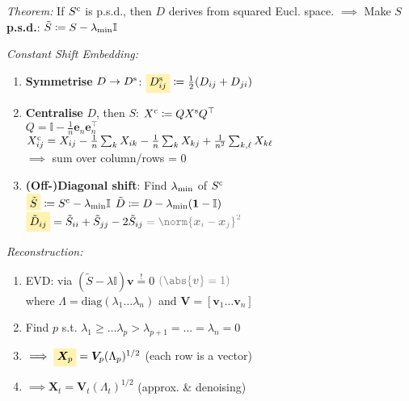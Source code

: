 \emph{Theorem:}\enspace
If $S^\mathrm{c}$ is p.s.d., then $D$ derives from squared Eucl. space.
$\implies$ Make $S$ \textbf{p.s.d.}: \enskip $\tilde S \coloneqq S - \lambda_\mathrm{min} \mathbb I$

\emph{Constant Shift Embedding:}\\
\begin{enumerate}
    \item \textbf{Symmetrise} $D \to D^\mathrm{s}$:
        \enskip $\highlight{D_{ij}\ap{s}} \coloneqq \frac12 (D_{ij} + D_{ji})$
    \item \textbf{Centralise} $D$, then $S$:
        \enskip $X^\mathrm{c} \coloneqq Q X^\mathrm{s} Q^\top$\\
        $Q = \mathbb I - \frac1n \bm e_n \bm e_n^\top$
        \qquad {}\\
        $X^\mathrm{c}_{ij} = X_{ij} - \frac1n \sum_k X_{ik} - \frac1n \sum_k X_{kj} + \frac{1}{n^2} \sum_{k,\ell} X_{k\ell}$\\
        $\implies$ sum over column/rows = 0
    \item \textbf{(Off-)Diagonal shift}:
        \enskip Find $\lambda_\mathrm{min}$ of $S^\mathrm{c}$\\
        $\highlight{\tilde S} \coloneqq S\ap{c} - \lambda\ped{min} \mathbb I$
        \qquad $\tilde D \coloneqq D - \lambda_\mathrm{min} (\bm 1 - \mathbb I)$\\
        $\highlight{\tilde D_{ij}} = \tilde S_{ii} + \tilde S_{jj} - 2 \tilde S_{ij} \color{gray} = \norm{\bm x_i - \bm x_j}^2$
\end{enumerate}

\emph{Reconstruction:}\\
\begin{enumerate}
    \item EVD:
        \enskip {}
        \enskip via \enskip $(\tilde S - \lambda \mathbb I) \bm v \overset!= 0$
        \enskip $\color{gray} (\abs{\bm v} = 1)$\\
        where \: $\Lambda {=} \mathrm{diag}(\lambda_1 \ldots \lambda_n)$
        \: and \: $\bm V {=} [\bm v_1 \ldots \bm v_n]$
    \item Find $p$ s.t. $\lambda_1 \geq \ldots \lambda_p > \lambda_{p+1} = \ldots = \lambda_n = 0$
    \item $\implies \highlight{\bm X_p} = \bm V_p (\Lambda_p)^{1/2}$
        \enskip (each row is a vector)
    \item $\implies \bm X_t = \bm V_t (\Lambda_t)^{1/2}$
        \enskip (approx. \& denoising)
\end{enumerate}

